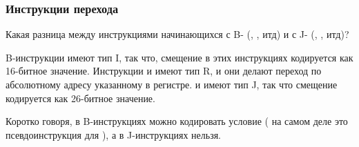 \subsubsection{Инструкции перехода}

Какая разница между инструкциями начинающихся с B- (, , итд) и с J- (, , итд)?

B-инструкции имеют тип I, так что, смещение в этих инструкциях кодируется как 16-битное значение.
Инструкции  и  имеют тип R, и они делают переход по абсолютному адресу указанному в регистре.
 и  имеют тип J, так что смещение кодируется как 26-битное значение.

Коротко говоря, в B-инструкциях можно кодировать условие 
( на самом деле это псевдоинструкция для ),
а в J-инструкциях нельзя.

